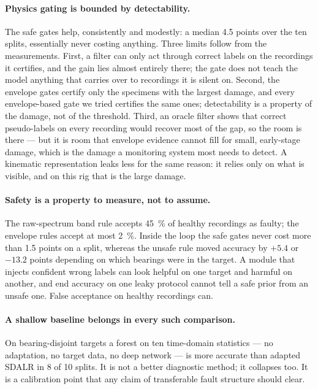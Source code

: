 \paragraph{Physics gating is bounded by detectability.} The safe gates help, consistently and modestly: a median 4.5 points
over the ten splits, essentially never costing anything. Three limits follow from the measurements. First, a filter can only
act through correct labels on the recordings it certifies, and the gain lies almost entirely there; the gate does not teach
the model anything that carries over to recordings it is silent on. Second, the envelope gates certify only the specimens with
the largest damage, and every envelope-based gate we tried certifies the same ones; detectability is a property of the damage, not of
the threshold. Third, an oracle filter shows that correct pseudo-labels on every recording would recover most of the gap, so
the room is there --- but it is room that envelope evidence cannot fill for small, early-stage damage, which is the damage a
monitoring system most needs to detect. A kinematic representation leaks less for the same reason: it relies only on what is
visible, and on this rig that is the large damage.

\paragraph{Safety is a property to measure, not to assume.} The raw-spectrum band rule accepts \SI{45}{\percent} of healthy
recordings as faulty; the envelope rules accept at most \SI{2}{\percent}. Inside the loop the safe gates never cost more than
1.5 points on a split, whereas the unsafe rule moved accuracy by $+5.4$ or $-13.2$ points depending on which bearings were in
the target. A module that injects confident wrong labels can look helpful on one target and harmful on another, and end
accuracy on one leaky protocol cannot tell a safe prior from an unsafe one. False acceptance on healthy recordings can.

\paragraph{A shallow baseline belongs in every such comparison.} On bearing-disjoint targets a forest on ten time-domain
statistics --- no adaptation, no target data, no deep network --- is more accurate than adapted SDALR in 8 of 10 splits. It is
not a better diagnostic method; it collapses too. It is a calibration point that any claim of transferable fault structure
should clear.

